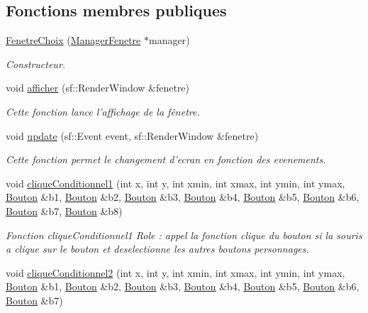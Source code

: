 \subsection*{\-Fonctions membres publiques}
\begin{DoxyCompactItemize}
\item 
\hypertarget{classFenetreChoix_a6a4e020bf1c6cf245fd14dcf07f99caa}{\hyperlink{classFenetreChoix_a6a4e020bf1c6cf245fd14dcf07f99caa}{\-Fenetre\-Choix} (\hyperlink{classManagerFenetre}{\-Manager\-Fenetre} $\ast$manager)}\label{classFenetreChoix_a6a4e020bf1c6cf245fd14dcf07f99caa}

\begin{DoxyCompactList}\small\item\em \-Constructeur. \end{DoxyCompactList}\item 
void \hyperlink{classFenetreChoix_a05e6aa6b6fd91b446751c8cb88a1a57a}{afficher} (sf\-::\-Render\-Window \&fenetre)
\begin{DoxyCompactList}\small\item\em \-Cette fonction lance l'affichage de la fênetre. \end{DoxyCompactList}\item 
void \hyperlink{classFenetreChoix_aab1bddc2946e39272d6c56a0a0065b6b}{update} (sf\-::\-Event event, sf\-::\-Render\-Window \&fenetre)
\begin{DoxyCompactList}\small\item\em \-Cette fonction permet le changement d'ecran en fonction des evenements. \end{DoxyCompactList}\item 
\hypertarget{classFenetreChoix_a0402ba8288130bb9741adff241463c6d}{void \hyperlink{classFenetreChoix_a0402ba8288130bb9741adff241463c6d}{clique\-Conditionnel1} (int x, int y, int xmin, int xmax, int ymin, int ymax, \hyperlink{classBouton}{\-Bouton} \&b1, \hyperlink{classBouton}{\-Bouton} \&b2, \hyperlink{classBouton}{\-Bouton} \&b3, \hyperlink{classBouton}{\-Bouton} \&b4, \hyperlink{classBouton}{\-Bouton} \&b5, \hyperlink{classBouton}{\-Bouton} \&b6, \hyperlink{classBouton}{\-Bouton} \&b7, \hyperlink{classBouton}{\-Bouton} \&b8)}\label{classFenetreChoix_a0402ba8288130bb9741adff241463c6d}

\begin{DoxyCompactList}\small\item\em \-Fonction clique\-Conditionnel1 \-Role \-: appel la fonction clique du bouton si la souris a clique sur le bouton et deselectionne les autres boutons personnages. \end{DoxyCompactList}\item 
\hypertarget{classFenetreChoix_a5dc40221cb4023dab8142a5fcfad30c1}{void \hyperlink{classFenetreChoix_a5dc40221cb4023dab8142a5fcfad30c1}{clique\-Conditionnel2} (int x, int y, int xmin, int xmax, int ymin, int ymax, \hyperlink{classBouton}{\-Bouton} \&b1, \hyperlink{classBouton}{\-Bouton} \&b2, \hyperlink{classBouton}{\-Bouton} \&b3, \hyperlink{classBouton}{\-Bouton} \&b4, \hyperlink{classBouton}{\-Bouton} \&b5, \hyperlink{classBouton}{\-Bouton} \&b6, \hyperlink{classBouton}{\-Bouton} \&b7)}\label{classFenetreChoix_a5dc40221cb4023dab8142a5fcfad30c1}


\end{DoxyCompactItemize}
